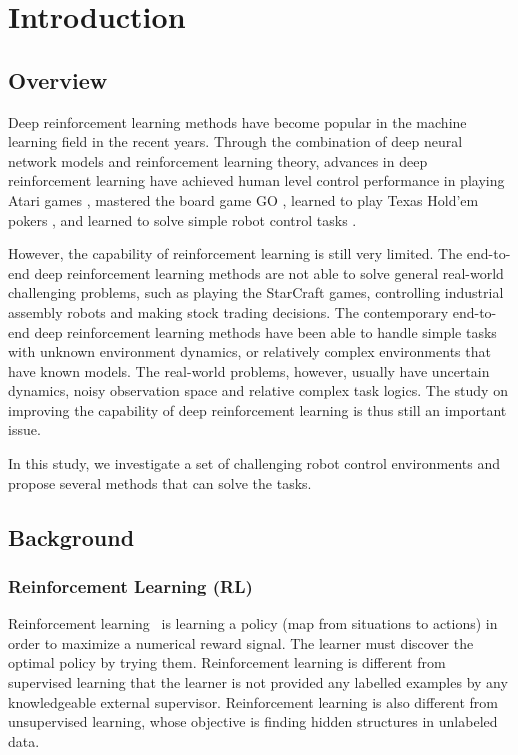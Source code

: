 
\chapter{Introduction}
\section{Overview}
Deep reinforcement learning methods have become popular in the machine learning field in the recent years. Through the combination of deep neural network models and reinforcement learning theory, advances in deep reinforcement learning have achieved human level control performance in playing Atari games \cite{mnih2015human}, mastered the board game GO \cite{silver2016mastering}, learned to play Texas Hold'em pokers \cite{heinrich2016deep}, and learned to solve simple robot control tasks \cite{duan2016benchmarking}.

However, the capability of reinforcement learning is still very limited. The end-to-end deep reinforcement learning methods are not able to solve general real-world challenging problems, such as playing the StarCraft games, controlling industrial assembly robots and making stock trading decisions. The contemporary end-to-end deep reinforcement learning methods have been able to handle simple tasks with unknown environment dynamics, or relatively complex environments that have known models. The real-world problems, however, usually have uncertain dynamics, noisy observation space and relative complex task logics. The study on improving the capability of deep reinforcement learning is thus still an important issue.

In this study, we investigate a set of challenging robot control environments and propose several methods that can solve the tasks.
\section{Background}

\subsection{Reinforcement Learning (RL)}
Reinforcement learning~\cite{sutton1998reinforcement} is learning a policy (map from situations to actions) in order to maximize a numerical reward signal. The learner must discover the optimal policy by trying them. Reinforcement learning is different from supervised learning that the learner is not provided any labelled examples by any knowledgeable external supervisor. Reinforcement learning is also different from unsupervised learning, whose objective is finding hidden structures in unlabeled data.

